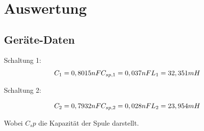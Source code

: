   \section{Auswertung}
  \label{sec:Auswertung}

  \subsection{Geräte-Daten}
  Schaltung 1:
  \begin{equation*}
    C_1 = 0,8015nF \\
    C_{sp,1} = 0,037nF \\
    L_1 = 32,351mH \\
  \end{equation*}

  Schaltung 2:

  \begin{equation*}
    C_2 = 0,7932nF \\
    C_{sp,2} = 0,028nF \\
    L_2 = 23,954mH \\
  \end{equation*}

  Wobei $C_sp$ die Kapazität der Spule darstellt.
